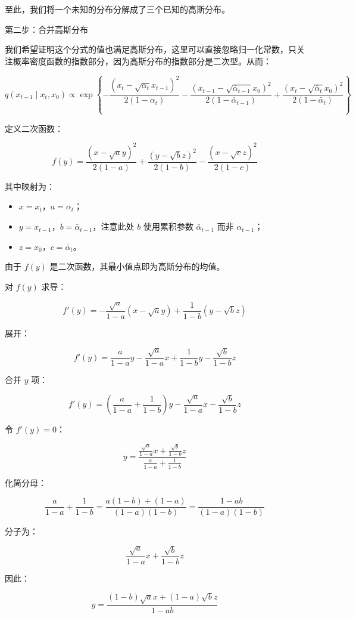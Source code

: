 至此，我们将一个未知的分布分解成了三个已知的高斯分布。

第二步：合并高斯分布

我们希望证明这个分式的值也满足高斯分布，这里可以直接忽略归一化常数，只关注概率密度函数的指数部分，因为高斯分布的指数部分是二次型。从而：

\[
q(x_{t-1}\mid x_t,x_0)
\propto
\exp\left\{
-\frac{(x_t-\sqrt{\alpha_t}x_{t-1})^2}{2(1-\alpha_t)}
-\frac{(x_{t-1}-\sqrt{\bar{\alpha}_{t-1}}x_0)^2}{2(1-\bar{\alpha}_{t-1})}
+\frac{(x_t-\sqrt{\bar{\alpha}_t}x_0)^2}{2(1-\bar{\alpha}_t)}
\right\}
\]

定义二次函数：

\[
f(y)=
\frac{(x-\sqrt{a}y)^2}{2(1-a)}
+\frac{(y-\sqrt{b}z)^2}{2(1-b)}
-\frac{(x-\sqrt{c}z)^2}{2(1-c)}
\]

其中映射为：

\begin{itemize}
\tightlist
\item
  \(x=x_t\)，\(a=\alpha_t\)；
\item
  \(y=x_{t-1}\)，\(b=\bar{\alpha}_{t-1}\)，注意此处 \(b\) 使用累积参数 \(\bar{\alpha}_{t-1}\) 而非 \(\alpha_{t-1}\)；
\item
  \(z=x_0\)，\(c=\bar{\alpha}_t\)。
\end{itemize}

由于 \(f(y)\) 是二次函数，其最小值点即为高斯分布的均值。

对 \(f(y)\) 求导：

\[
f'(y)=-\frac{\sqrt{a}}{1-a}(x-\sqrt{a}y)+\frac{1}{1-b}(y-\sqrt{b}z)
\]

展开：

\[
f'(y)=\frac{a}{1-a}y-\frac{\sqrt{a}}{1-a}x+\frac{1}{1-b}y-\frac{\sqrt{b}}{1-b}z
\]

合并 \(y\) 项：

\[
f'(y)=\left(\frac{a}{1-a}+\frac{1}{1-b}\right)y-\frac{\sqrt{a}}{1-a}x-\frac{\sqrt{b}}{1-b}z
\]

令 \(f'(y)=0\)：

\[
y=\frac{\frac{\sqrt{a}}{1-a}x+\frac{\sqrt{b}}{1-b}z}{\frac{a}{1-a}+\frac{1}{1-b}}
\]

化简分母：

\[
\frac{a}{1-a}+\frac{1}{1-b}
=\frac{a(1-b)+(1-a)}{(1-a)(1-b)}
=\frac{1-ab}{(1-a)(1-b)}
\]

分子为：

\[
\frac{\sqrt{a}}{1-a}x+\frac{\sqrt{b}}{1-b}z
\]

因此：

\[
y=\frac{(1-b)\sqrt{a}x+(1-a)\sqrt{b}z}{1-ab}
\]

